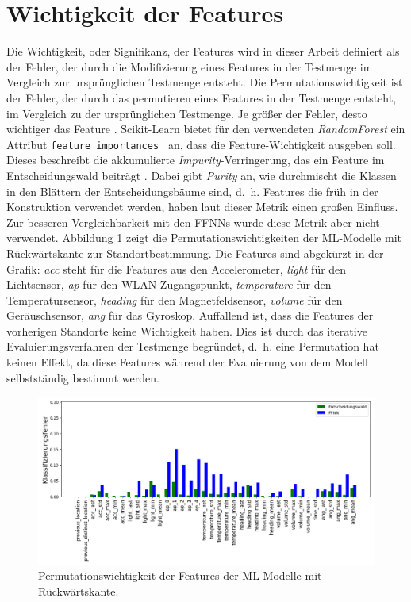\newpage
\section{Wichtigkeit der Features}
\label{sec:eval_feature_importance}
Die Wichtigkeit, oder Signifikanz, der Features wird in dieser Arbeit definiert als der Fehler,
der durch die Modifizierung eines Features in der Testmenge im Vergleich zur ursprünglichen Testmenge entsteht.
Die Permutationswichtigkeit ist der Fehler, der durch das permutieren eines Features in der Testmenge entsteht, im Vergleich zu der ursprünglichen Testmenge.
Je größer der Fehler, desto wichtiger das Feature \cite{breiman2001random}.
\newline
\newline
Scikit-Learn bietet für den verwendeten \textit{RandomForest} ein Attribut \texttt{feature\_importances\_} an, dass die Feature-Wichtigkeit ausgeben soll.
Dieses beschreibt die akkumulierte \textit{Impurity}-Verringerung, das ein Feature im Entscheidungswald beiträgt \cite{ScikitLearnFeatureImportance}.
Dabei gibt \textit{Purity} an, wie durchmischt die Klassen in den Blättern der Entscheidungsbäume sind,
d.~h. Features die früh in der Konstruktion verwendet werden, haben laut dieser Metrik einen großen Einfluss.
Zur besseren Vergleichbarkeit mit den FFNNs wurde diese Metrik aber nicht verwendet.
\newline
\newline
Abbildung \ref{fig:fi_consolidated} zeigt die Permutationswichtigkeiten der ML-Modelle mit Rückwärtskante zur Standortbestimmung.
Die Features sind abgekürzt in der Grafik: \textit{acc} steht für die Features aus den Accelerometer, \textit{light} für den Lichtsensor, \textit{ap} für den WLAN-Zugangspunkt,
\textit{temperature} für den Temperatursensor, \textit{heading} für den Magnetfeldsensor, \textit{volume} für den Geräuschsensor, \textit{ang} für das Gyroskop.
\newpage
Auffallend ist, dass die Features der vorherigen Standorte keine Wichtigkeit haben.
Dies ist durch das iterative Evaluierungsverfahren der Testmenge begründet,
d.~h. eine Permutation hat keinen Effekt, da diese Features während der Evaluierung von dem Modell selbstständig bestimmt werden.
\begin{figure}[h!]
    \centering
    \includegraphics[width=\linewidth]{images/fi_consolidated.png}
    \caption{Permutationswichtigkeit der Features der ML-Modelle mit Rückwärtskante.}
    \label{fig:fi_consolidated}
\end{figure}
